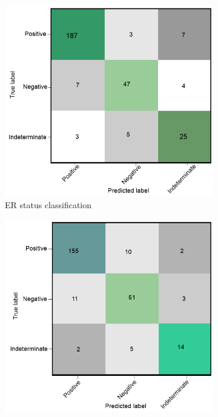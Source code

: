 \begin{figure}[h]
	\centering
	\begin{subfigure}{.49\linewidth}
		\centering
		\includegraphics[scale=0.8]{images/conf_er.png}
		\caption{ER status classification}
        \label{fig:er_confusion}
	\end{subfigure}
	\begin{subfigure}{.49\linewidth}
		\centering
		\includegraphics[scale=0.8]{images/conf_pgr.png}

\end{subfigure}
\end{figure}
